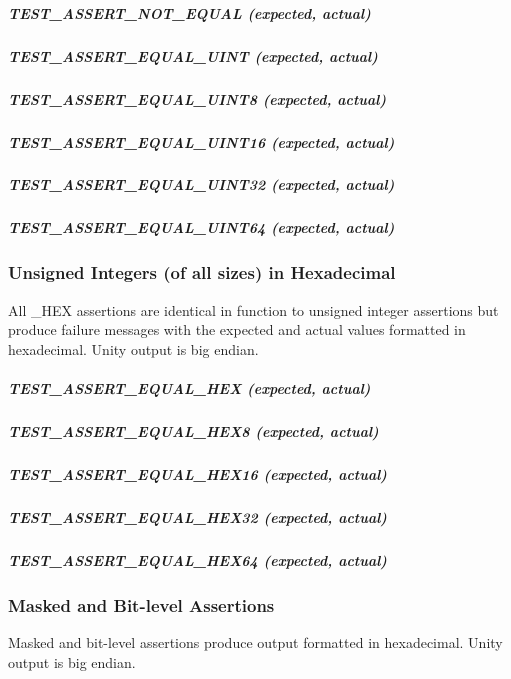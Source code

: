 \subparagraph*{{\ttfamily T\+E\+S\+T\+\_\+\+A\+S\+S\+E\+R\+T\+\_\+\+N\+O\+T\+\_\+\+E\+Q\+U\+AL (expected, actual)}}

\subparagraph*{{\ttfamily T\+E\+S\+T\+\_\+\+A\+S\+S\+E\+R\+T\+\_\+\+E\+Q\+U\+A\+L\+\_\+\+U\+I\+NT (expected, actual)}}

\subparagraph*{{\ttfamily T\+E\+S\+T\+\_\+\+A\+S\+S\+E\+R\+T\+\_\+\+E\+Q\+U\+A\+L\+\_\+\+U\+I\+N\+T8 (expected, actual)}}

\subparagraph*{{\ttfamily T\+E\+S\+T\+\_\+\+A\+S\+S\+E\+R\+T\+\_\+\+E\+Q\+U\+A\+L\+\_\+\+U\+I\+N\+T16 (expected, actual)}}

\subparagraph*{{\ttfamily T\+E\+S\+T\+\_\+\+A\+S\+S\+E\+R\+T\+\_\+\+E\+Q\+U\+A\+L\+\_\+\+U\+I\+N\+T32 (expected, actual)}}

\subparagraph*{{\ttfamily T\+E\+S\+T\+\_\+\+A\+S\+S\+E\+R\+T\+\_\+\+E\+Q\+U\+A\+L\+\_\+\+U\+I\+N\+T64 (expected, actual)}}

\subsubsection*{Unsigned Integers (of all sizes) in Hexadecimal}

All {\ttfamily \+\_\+\+H\+EX} assertions are identical in function to unsigned integer assertions but produce failure messages with the {\ttfamily expected} and {\ttfamily actual} values formatted in hexadecimal. Unity output is big endian.

\subparagraph*{{\ttfamily T\+E\+S\+T\+\_\+\+A\+S\+S\+E\+R\+T\+\_\+\+E\+Q\+U\+A\+L\+\_\+\+H\+EX (expected, actual)}}

\subparagraph*{{\ttfamily T\+E\+S\+T\+\_\+\+A\+S\+S\+E\+R\+T\+\_\+\+E\+Q\+U\+A\+L\+\_\+\+H\+E\+X8 (expected, actual)}}

\subparagraph*{{\ttfamily T\+E\+S\+T\+\_\+\+A\+S\+S\+E\+R\+T\+\_\+\+E\+Q\+U\+A\+L\+\_\+\+H\+E\+X16 (expected, actual)}}

\subparagraph*{{\ttfamily T\+E\+S\+T\+\_\+\+A\+S\+S\+E\+R\+T\+\_\+\+E\+Q\+U\+A\+L\+\_\+\+H\+E\+X32 (expected, actual)}}

\subparagraph*{{\ttfamily T\+E\+S\+T\+\_\+\+A\+S\+S\+E\+R\+T\+\_\+\+E\+Q\+U\+A\+L\+\_\+\+H\+E\+X64 (expected, actual)}}

\subsubsection*{Masked and Bit-\/level Assertions}

Masked and bit-\/level assertions produce output formatted in hexadecimal. Unity output is big endian.

